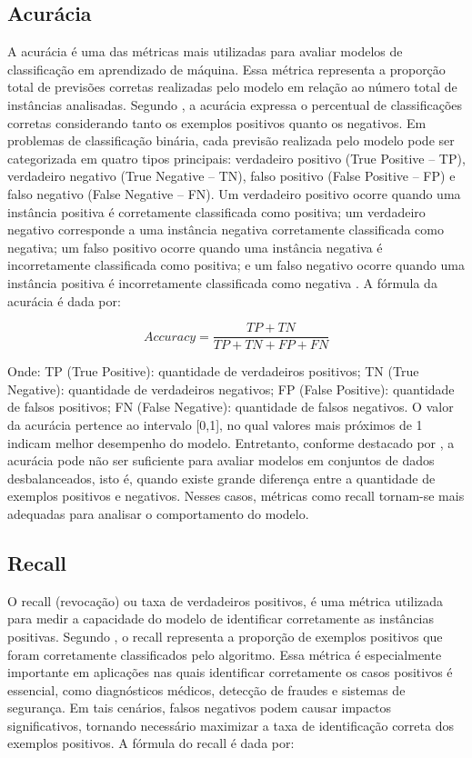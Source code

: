 \documentclass[
    12pt,                %
    openright,           %
    oneside,             %
    a4paper,             %
    english,             %
    brazil               %
]{abntex2}
\begin{document}
\subsection{Acurácia}
A acurácia é uma das métricas mais utilizadas para avaliar modelos de classificação em aprendizado de máquina. Essa métrica representa a proporção total de previsões corretas realizadas pelo modelo em relação ao número total de instâncias analisadas. Segundo , a acurácia expressa o percentual de classificações corretas considerando tanto os exemplos positivos quanto os negativos.
Em problemas de classificação binária, cada previsão realizada pelo modelo pode ser categorizada em quatro tipos principais: verdadeiro positivo (True Positive – TP), verdadeiro negativo (True Negative – TN), falso positivo (False Positive – FP) e falso negativo (False Negative – FN). Um verdadeiro positivo ocorre quando uma instância positiva é corretamente classificada como positiva; um verdadeiro negativo corresponde a uma instância negativa corretamente classificada como negativa; um falso positivo ocorre quando uma instância negativa é incorretamente classificada como positiva; e um falso negativo ocorre quando uma instância positiva é incorretamente classificada como negativa \cite{Rainio2024}.
A fórmula da acurácia é dada por:

\begin{equation}
Accuracy = \frac{TP + TN}{TP + TN + FP + FN}
\end{equation}


Onde:
TP (True Positive): quantidade de verdadeiros positivos;
TN (True Negative): quantidade de verdadeiros negativos;
FP (False Positive): quantidade de falsos positivos;
FN (False Negative): quantidade de falsos negativos.
O valor da acurácia pertence ao intervalo [0,1], no qual valores mais próximos de 1 indicam melhor desempenho do modelo. Entretanto, conforme destacado por , a acurácia pode não ser suficiente para avaliar modelos em conjuntos de dados desbalanceados, isto é, quando existe grande diferença entre a quantidade de exemplos positivos e negativos. Nesses casos, métricas como recall tornam-se mais adequadas para analisar o comportamento do modelo.

\subsection{Recall}
O recall (revocação) ou taxa de verdadeiros positivos, é uma métrica utilizada para medir a capacidade do modelo de identificar corretamente as instâncias positivas. Segundo , o recall representa a proporção de exemplos positivos que foram corretamente classificados pelo algoritmo.
Essa métrica é especialmente importante em aplicações nas quais identificar corretamente os casos positivos é essencial, como diagnósticos médicos, detecção de fraudes e sistemas de segurança. Em tais cenários, falsos negativos podem causar impactos significativos, tornando necessário maximizar a taxa de identificação correta dos exemplos positivos.
A fórmula do recall é dada por:
\end{document}
